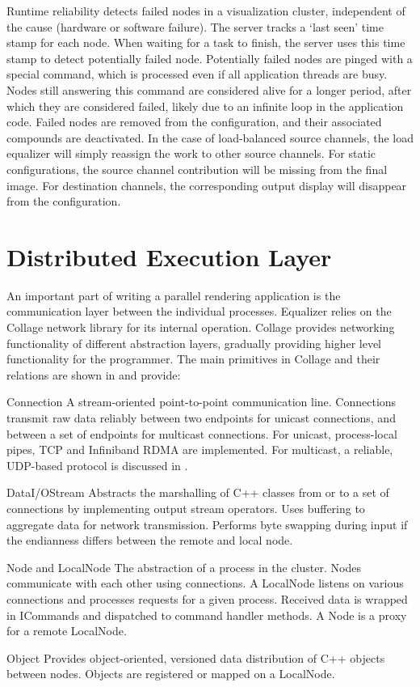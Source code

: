 Runtime reliability detects failed nodes in a visualization cluster,
independent of the cause (hardware or software failure). The server tracks a
`last seen' time stamp for each node. When waiting for a task to finish, the
server uses this time stamp to detect potentially failed node. Potentially
failed nodes are pinged with a special command, which is processed even if all
application threads are busy. Nodes still answering this command are considered
alive for a longer period, after which they are considered failed, likely due
to an infinite loop in the application code. Failed nodes are removed from the
configuration, and their associated compounds are deactivated. In the case of
load-balanced source channels, the load equalizer will simply reassign the work
to other source channels. For static configurations, the source channel
contribution will be missing from the final image. For destination channels,
the corresponding output display will disappear from the configuration.

\section{Distributed Execution Layer}

An important part of writing a parallel rendering application is the
communication layer between the individual processes. \textsf{Equalizer} relies
on the \textsf{Collage} network library for its internal operation.
\textsf{Collage} provides networking functionality of different abstraction
layers, gradually providing higher level functionality for the programmer. The
main primitives in \textsf{Collage} and their relations are shown in
 and provide:

\begin{compactdesc}
\item[Connection] A stream-oriented point-to-point communication
  line. Connections
  transmit raw data reliably between two endpoints for unicast connections, and
  between a set of endpoints for multicast connections. For unicast,
  process-local pipes, TCP and Infiniband RDMA are implemented. For multicast,
  a reliable, UDP-based protocol is discussed in .
\item[DataI/OStream] Abstracts the marshalling of C++ classes from or to
  a set of connections by implementing output stream operators. Uses buffering
  to aggregate data for network transmission. Performs byte swapping during
  input if the endianness differs between the remote and local node.
\item[Node and LocalNode] The abstraction of a process in the cluster. Nodes
  communicate with each other using connections. A LocalNode listens on various
  connections and processes requests for a given process. Received data is
  wrapped in ICommands and dispatched to command handler methods. A Node is a
  proxy for a remote LocalNode.
\item[Object] Provides object-oriented, versioned data distribution of C++
  objects between nodes. Objects are registered or mapped on a Local\-Node.
\end{compactdesc}

